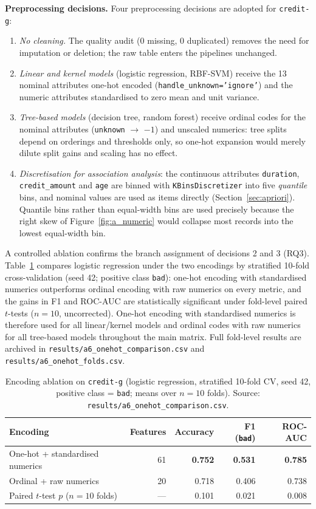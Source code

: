 \textbf{Preprocessing decisions.} Four preprocessing decisions are adopted for
\texttt{credit-g}:
\begin{enumerate}
  \item \emph{No cleaning.} The quality audit (0 missing, 0 duplicated) removes the
  need for imputation or deletion; the raw table enters the pipelines unchanged.
  \item \emph{Linear and kernel models} (logistic regression, RBF-SVM) receive the
  13 nominal attributes one-hot encoded (\texttt{handle\_unknown='ignore'}) and the
  numeric attributes standardised to zero mean and unit variance.
  \item \emph{Tree-based models} (decision tree, random forest) receive ordinal
  codes for the nominal attributes (\texttt{unknown} $\rightarrow$ $-1$) and
  unscaled numerics: tree splits depend on orderings and thresholds only, so
  one-hot expansion would merely dilute split gains and scaling has no effect.
  \item \emph{Discretisation for association analysis}: the continuous attributes
  \texttt{duration}, \texttt{credit\_amount} and \texttt{age} are binned with
  \texttt{KBinsDiscretizer} into five \emph{quantile} bins, and nominal values are
  used as items directly (Section~\ref{sec:apriori}). Quantile bins rather than
  equal-width bins are used precisely because the right skew of
  Figure~\ref{fig:a_numeric} would collapse most records into the lowest equal-width
  bin.
\end{enumerate}

A controlled ablation confirms the branch assignment of decisions 2 and 3 (RQ3).
Table~\ref{tab:a_encoding} compares logistic regression under the two encodings by
stratified 10-fold cross-validation (seed 42; positive class \texttt{bad}): one-hot
encoding with standardised numerics outperforms ordinal encoding with raw numerics
on every metric, and the gains in F1 and ROC-AUC are statistically significant
under fold-level paired $t$-tests ($n = 10$, uncorrected). One-hot encoding with
standardised numerics is therefore used for all linear/kernel models and ordinal
codes with raw numerics for all tree-based models throughout the main matrix. Full
fold-level results are archived in \texttt{results/a6\_onehot\_comparison.csv} and
\texttt{results/a6\_onehot\_folds.csv}.

\begin{table}[H]
\centering
\caption{Encoding ablation on \texttt{credit-g} (logistic regression, stratified
10-fold CV, seed 42, positive class = \texttt{bad}; means over $n = 10$ folds).
Source: \texttt{results/a6\_onehot\_comparison.csv}.}
\label{tab:a_encoding}
\begin{tabular}{lrrrr}
\toprule
Encoding & Features & Accuracy & F1 (\texttt{bad}) & ROC-AUC \\
\midrule
One-hot + standardised numerics & 61 & \textbf{0.752} & \textbf{0.531} & \textbf{0.785} \\
Ordinal + raw numerics & 20 & 0.718 & 0.406 & 0.738 \\
\midrule
Paired $t$-test $p$ ($n = 10$ folds) & --- & 0.101 & 0.021 & 0.008 \\
\bottomrule
\end{tabular}
\end{table}
